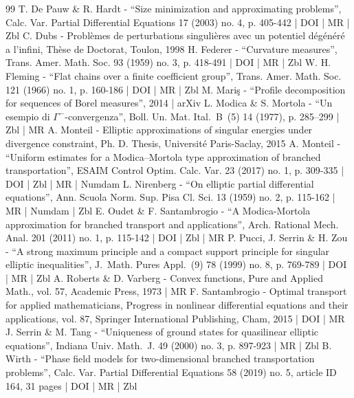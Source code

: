 \documentclass[10pt]{amsart}
\theoremstyle{plain}
\theoremstyle{definition}
\begin{document}
\begin{thebibliography}{99}
T. De Pauw \& R. Hardt - “Size minimization and approximating problems”, Calc. Var. Partial Differential Equations 17 (2003) no. 4, p. 405-442 | DOI | MR | Zbl
C. Dubs - Problèmes de perturbations singulières avec un potentiel dégénéré a l’infini, Thèse de Doctorat, Toulon, 1998
H. Federer - “Curvature measures”, Trans. Amer. Math. Soc. 93 (1959) no. 3, p. 418-491 | DOI | MR | Zbl
W. H. Fleming - “Flat chains over a finite coefficient group”, Trans. Amer. Math. Soc. 121 (1966) no. 1, p. 160-186 | DOI | MR | Zbl
M. Mariş - “Profile decomposition for sequences of Borel measures”, 2014 | arXiv
L. Modica \& S. Mortola - “Un esempio di $\Gamma ^-$-convergenza”, Boll. Un. Mat. Ital. B (5) 14 (1977), p. 285–299 | Zbl | MR
A. Monteil - Elliptic approximations of singular energies under divergence constraint, Ph. D. Thesis, Université Paris-Saclay, 2015
A. Monteil - “Uniform estimates for a Modica–Mortola type approximation of branched transportation”, ESAIM Control Optim. Calc. Var. 23 (2017) no. 1, p. 309-335 | DOI | Zbl | MR | Numdam
L. Nirenberg - “On elliptic partial differential equations”, Ann. Scuola Norm. Sup. Pisa Cl. Sci. 13 (1959) no. 2, p. 115-162 | MR | Numdam | Zbl
E. Oudet \& F. Santambrogio - “A Modica-Mortola approximation for branched transport and applications”, Arch. Rational Mech. Anal. 201 (2011) no. 1, p. 115-142 | DOI | Zbl | MR
P. Pucci, J. Serrin \& H. Zou - “A strong maximum principle and a compact support principle for singular elliptic inequalities”, J. Math. Pures Appl. (9) 78 (1999) no. 8, p. 769-789 | DOI | MR | Zbl
A. Roberts \& D. Varberg - Convex functions, Pure and Applied Math., vol. 57, Academic Press, 1973 | MR
F. Santambrogio - Optimal transport for applied mathematicians, Progress in nonlinear differential equations and their applications, vol. 87, Springer International Publishing, Cham, 2015 | DOI | MR
J. Serrin \& M. Tang - “Uniqueness of ground states for quasilinear elliptic equations”, Indiana Univ. Math. J. 49 (2000) no. 3, p. 897-923 | MR | Zbl
B. Wirth - “Phase field models for two-dimensional branched transportation problems”, Calc. Var. Partial Differential Equations 58 (2019) no. 5, article ID 164, 31 pages | DOI | MR | Zbl
\end{thebibliography}
\end{document}
